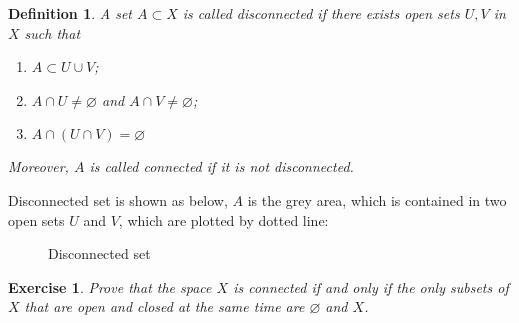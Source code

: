 \documentclass[12pt,leqno]{amsart}
\newtheorem{definition}{Definition}[section]
\newtheorem{exercise}{Exercise}[section]
\theoremstyle{definition}
\numberwithin{equation}{subsection}
\begin{document}
\begin{definition}
A set $A\subset X$ is called disconnected if there exists open sets $U, V$ in $X$ such that 
\begin{enumerate}
    \item $A\subset U\cup V$;
    \item $A\cap U\neq \varnothing$ and $A\cap V\neq \varnothing$;
    \item $A\cap (U\cap V) = \varnothing$
\end{enumerate}
Moreover, $A$ is called connected if it is not disconnected.
\end{definition}
Disconnected set is shown as below, $A$ is the grey area, which is contained in two open sets $U$ and $V$, which are plotted by dotted line: \\
\def\firstcircle{(0,0) circle (1cm)}
\def\secondcircle{(2.7,0) circle (1cm)}
\def\thirdcircle{(0,0) circle (1.5cm)}
\def\forthcircle{(0,0) circle (1.5cm)}
\begin{figure}[h]
    \label{fig:disconnected}
    \begin{center}
    \end{center}
    \caption{Disconnected set}
\end{figure}

\medskip

\begin{exercise}
Prove that the space $X$ is connected if and only if the only subsets of $X$ that are open and closed at the same time are $\varnothing$ and $X$.
\end{exercise}
\end{document}
